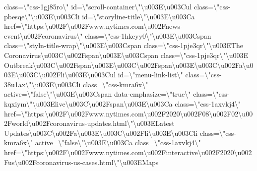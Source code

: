 class=\textbackslash{}"css-1gj85ro\textbackslash{}"
id=\textbackslash{}"scroll-container\textbackslash{}"\textbackslash{}u003E\textbackslash{}u003Cul
class=\textbackslash{}"css-pbesqe\textbackslash{}"\textbackslash{}u003E\textbackslash{}u003Cli
id=\textbackslash{}"storyline-title\textbackslash{}"\textbackslash{}u003E\textbackslash{}u003Ca
href=\textbackslash{}"https:\textbackslash{}u002F\textbackslash{}u002Fwww.nytimes.com\textbackslash{}u002Fnews-event\textbackslash{}u002Fcoronavirus\textbackslash{}"
class=\textbackslash{}"css-1hkeyy0\textbackslash{}"\textbackslash{}u003E\textbackslash{}u003Cspan
class=\textbackslash{}"styln-title-wrap\textbackslash{}"\textbackslash{}u003E\textbackslash{}u003Cspan
class=\textbackslash{}"css-1pje3qr\textbackslash{}"\textbackslash{}u003EThe
Coronavirus\textbackslash{}u003C\textbackslash{}u002Fspan\textbackslash{}u003E\textbackslash{}u003Cspan
class=\textbackslash{}"css-1pje3qr\textbackslash{}"\textbackslash{}u003E
Outbreak\textbackslash{}u003C\textbackslash{}u002Fspan\textbackslash{}u003E\textbackslash{}u003C\textbackslash{}u002Fspan\textbackslash{}u003E\textbackslash{}u003C\textbackslash{}u002Fa\textbackslash{}u003E\textbackslash{}u003C\textbackslash{}u002Fli\textbackslash{}u003E\textbackslash{}u003Cul
id=\textbackslash{}"menu-link-list\textbackslash{}"
class=\textbackslash{}"css-38u1ax\textbackslash{}"\textbackslash{}u003E\textbackslash{}u003Cli
class=\textbackslash{}"css-kmra6x\textbackslash{}"
active=\textbackslash{}"false\textbackslash{}"\textbackslash{}u003E\textbackslash{}u003Cspan
data-emphasize=\textbackslash{}"true\textbackslash{}"
class=\textbackslash{}"css-kqxiym\textbackslash{}"\textbackslash{}u003Elive\textbackslash{}u003C\textbackslash{}u002Fspan\textbackslash{}u003E\textbackslash{}u003Ca
class=\textbackslash{}"css-1axvkj4\textbackslash{}"
href=\textbackslash{}"https:\textbackslash{}u002F\textbackslash{}u002Fwww.nytimes.com\textbackslash{}u002F2020\textbackslash{}u002F08\textbackslash{}u002F02\textbackslash{}u002Fworld\textbackslash{}u002Fcoronavirus-updates.html\textbackslash{}"\textbackslash{}u003ELatest
Updates\textbackslash{}u003C\textbackslash{}u002Fa\textbackslash{}u003E\textbackslash{}u003C\textbackslash{}u002Fli\textbackslash{}u003E\textbackslash{}u003Cli
class=\textbackslash{}"css-kmra6x\textbackslash{}"
active=\textbackslash{}"false\textbackslash{}"\textbackslash{}u003E\textbackslash{}u003Ca
class=\textbackslash{}"css-1axvkj4\textbackslash{}"
href=\textbackslash{}"https:\textbackslash{}u002F\textbackslash{}u002Fwww.nytimes.com\textbackslash{}u002Finteractive\textbackslash{}u002F2020\textbackslash{}u002Fus\textbackslash{}u002Fcoronavirus-us-cases.html\textbackslash{}"\textbackslash{}u003EMaps
